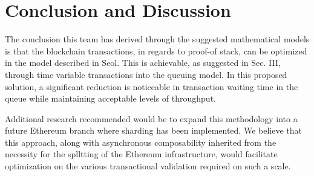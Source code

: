 \documentclass[conference]{IEEEtran}
\begin{document}
\section{Conclusion and Discussion}

The conclusion this team has derived through the suggested mathematical models is that 
the blockchain transactions, in regards to proof-of stack, can be optimized in the model 
described in Seol\cite{2020_ACM_Seol}. This is achievable, as suggested in Sec. III, through 
time variable transactions into the queuing model. In this proposed solution, a significant 
reduction is noticeable in transaction waiting time in the queue while maintaining acceptable 
levels of throughput.

Additional research recommended would be to expand this methodology into a future 
Ethereum branch where sharding has been implemented. We believe that this approach, 
along with asynchronous composability inherited from the necessity for the splltting of the 
Ethereum infrastructure, would facilitate optimization on the various transactional validation 
required on such a scale.



\end{document}
